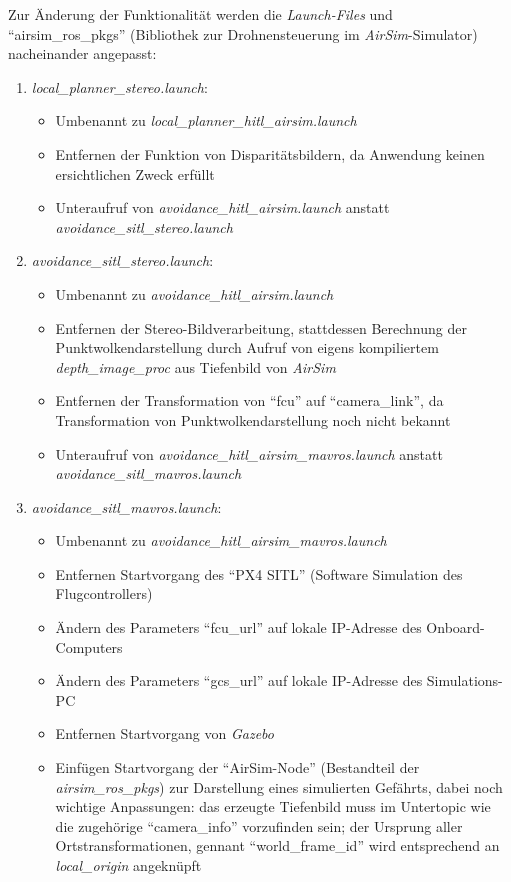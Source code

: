 Zur Änderung der Funktionalität werden die \textit{Launch-Files} und \enquote{airsim\_ros\_pkgs} (Bibliothek zur Drohnensteuerung im \textit{AirSim}-Simulator) nacheinander angepasst:
\begin{enumerate}
    \item \textit{local\_planner\_stereo.launch}:
    \begin{itemize}
        \item Umbenannt zu \textit{local\_planner\_hitl\_airsim.launch}
        \item Entfernen der Funktion von Disparitätsbildern, da Anwendung keinen ersichtlichen Zweck erfüllt
        \item Unteraufruf von \textit{avoidance\_hitl\_airsim.launch} anstatt \textit{avoidance\_sitl\_stereo.launch}
    \end{itemize}
    \item \textit{avoidance\_sitl\_stereo.launch}:
    \begin{itemize}
        \item Umbenannt zu \textit{avoidance\_hitl\_airsim.launch}
        \item Entfernen der Stereo-Bildverarbeitung, stattdessen Berechnung der Punktwolkendarstellung durch Aufruf von eigens kompiliertem \textit{depth\_image\_proc} aus Tiefenbild von \textit{AirSim}
        \item Entfernen der Transformation von \enquote{fcu} auf \enquote{camera\_link}, da Transformation von Punktwolkendarstellung noch nicht bekannt
        \item Unteraufruf von \textit{avoidance\_hitl\_airsim\_mavros.launch} anstatt \textit{avoidance\_sitl\_mavros.launch}
    \end{itemize}
    \item \textit{avoidance\_sitl\_mavros.launch}:
    \begin{itemize}
        \item Umbenannt zu \textit{avoidance\_hitl\_airsim\_mavros.launch}
        \item Entfernen Startvorgang des \enquote{PX4 SITL} (Software Simulation des Flugcontrollers)
        \item Ändern des Parameters \enquote{fcu\_url} auf lokale IP-Adresse des Onboard-Computers
        \item Ändern des Parameters \enquote{gcs\_url} auf lokale IP-Adresse des Simulations-PC
        \item Entfernen Startvorgang von \textit{Gazebo}
        \item Einfügen Startvorgang der \enquote{AirSim-Node} (Bestandteil der \textit{airsim\_ros\_pkgs}) zur Darstellung eines simulierten Gefährts, dabei noch wichtige Anpassungen: das erzeugte Tiefenbild muss im Untertopic wie die zugehörige \enquote{camera\_info} vorzufinden sein; der Ursprung aller Ortstransformationen, gennant \enquote{world\_frame\_id} wird entsprechend an \textit{local\_origin} angeknüpft

\end{itemize}
\end{enumerate}
